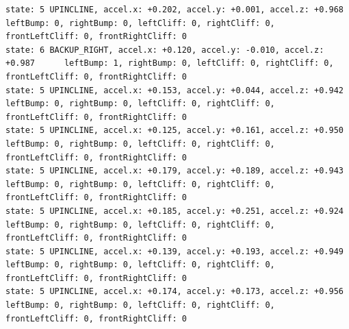 \documentclass[twoside]{article}
\begin{document}
\begin{lstlisting}[mathescape, frame=single]
state: 5 UPINCLINE, accel.x: +0.202, accel.y: +0.001, accel.z: +0.968      leftBump: 0, rightBump: 0, leftCliff: 0, rightCliff: 0, frontLeftCliff: 0, frontRightCliff: 0 
state: 6 BACKUP_RIGHT, accel.x: +0.120, accel.y: -0.010, accel.z: +0.987      leftBump: 1, rightBump: 0, leftCliff: 0, rightCliff: 0, frontLeftCliff: 0, frontRightCliff: 0 
state: 5 UPINCLINE, accel.x: +0.153, accel.y: +0.044, accel.z: +0.942      leftBump: 0, rightBump: 0, leftCliff: 0, rightCliff: 0, frontLeftCliff: 0, frontRightCliff: 0 
state: 5 UPINCLINE, accel.x: +0.125, accel.y: +0.161, accel.z: +0.950      leftBump: 0, rightBump: 0, leftCliff: 0, rightCliff: 0, frontLeftCliff: 0, frontRightCliff: 0 
state: 5 UPINCLINE, accel.x: +0.179, accel.y: +0.189, accel.z: +0.943      leftBump: 0, rightBump: 0, leftCliff: 0, rightCliff: 0, frontLeftCliff: 0, frontRightCliff: 0 
state: 5 UPINCLINE, accel.x: +0.185, accel.y: +0.251, accel.z: +0.924      leftBump: 0, rightBump: 0, leftCliff: 0, rightCliff: 0, frontLeftCliff: 0, frontRightCliff: 0 
state: 5 UPINCLINE, accel.x: +0.139, accel.y: +0.193, accel.z: +0.949      leftBump: 0, rightBump: 0, leftCliff: 0, rightCliff: 0, frontLeftCliff: 0, frontRightCliff: 0 
state: 5 UPINCLINE, accel.x: +0.174, accel.y: +0.173, accel.z: +0.956      leftBump: 0, rightBump: 0, leftCliff: 0, rightCliff: 0, frontLeftCliff: 0, frontRightCliff: 0
\end{lstlisting}

\end{document}

